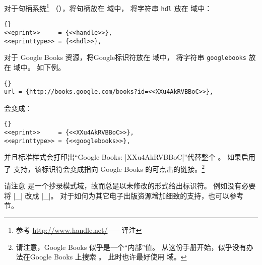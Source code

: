 对于句柄系统\footnote{%
参考 \url{http://www.handle.net/}——译注}
（），将句柄放在  域中，
将字符串 \texttt{hdl} 放在  域中：

\begin{lstlisting}[style=bibtex]{}
<<eprint>>     = {<<handle>>},
<<eprinttype>> = {<<hdl>>},
\end{lstlisting}
%
对于 Google Books 资源，将Google标识符放在  域中，
将字符串 \texttt{googlebooks} 放在  域中。
如下例。

\begin{lstlisting}[style=bibtex]{}
url = {http://books.google.com/books?id=<<XXu4AkRVBBoC>>},
\end{lstlisting}
%
会变成：

\begin{lstlisting}[style=bibtex]{}
<<eprint>>     = {<<XXu4AkRVBBoC>>},
<<eprinttype>> = {<<googlebooks>>},
\end{lstlisting}
%
并且标准样式会打印出“Google Books: |XXu4AkRVBBoC|”代替整个 。
如果启用了  支持，该标识符会变成指向 Google Books 的可点击的链接。\footnote{ %
	请注意，Google Books  似乎是一个“内部”值。
	从这份手册开始，似乎没有办法在Google Books 上搜索 。
	此时也许最好使用  域。%
}


请注意  是一个抄录模式域，故而总是以未修改的形式给出标识符。
例如没有必要将 |_| 改成 |\_|。
对于如何为其它电子出版资源增加细致的支持，也可以参考  节。

